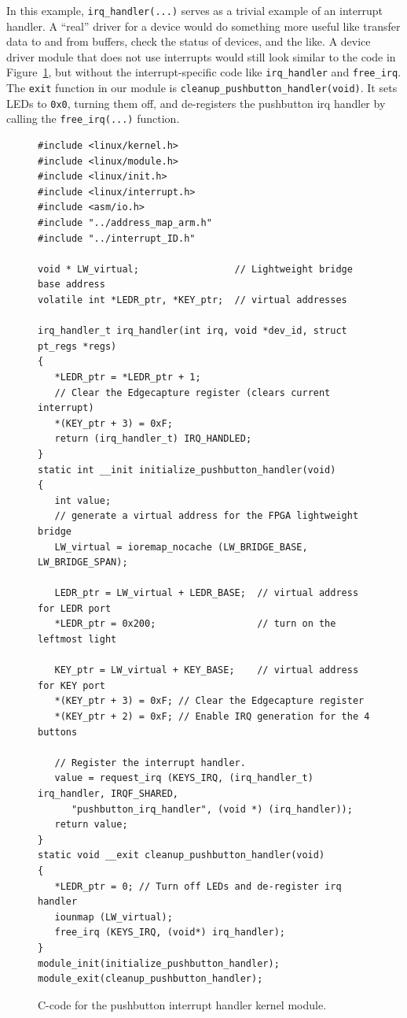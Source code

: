 \documentclass[11pt, twoside, pdftex]{article}
\begin{document}
In this example, \texttt{irq\_handler(...)} serves as a trivial example of an interrupt handler.
A ``real'' driver for a device would do something more useful like transfer data to and from 
buffers, check the status of devices, and the like. A device driver module that does not use
interrupts would still look similar to the code in Figure~\ref{fig:pushbutton_irq_handler_code}, 
but without the interrupt-specific code like \texttt{irq\_handler} and \texttt{free\_irq}.
The \texttt{exit} function in our module is \texttt{cleanup\_pushbutton\_handler(void)}. It sets 
LEDs to \texttt{0x0}, turning them off, and de-registers the pushbutton irq handler by calling 
the \texttt{free\_irq(...)} function. 

\lstset{language=C,numbers=left}
\begin{figure}[H]
\begin{center}
\begin{minipage}[t]{16 cm}
\begin{lstlisting}
#include <linux/kernel.h>
#include <linux/module.h>
#include <linux/init.h>
#include <linux/interrupt.h>
#include <asm/io.h>
#include "../address_map_arm.h"
#include "../interrupt_ID.h"

void * LW_virtual;                 // Lightweight bridge base address
volatile int *LEDR_ptr, *KEY_ptr;  // virtual addresses

irq_handler_t irq_handler(int irq, void *dev_id, struct pt_regs *regs)
{
   *LEDR_ptr = *LEDR_ptr + 1;
   // Clear the Edgecapture register (clears current interrupt)
   *(KEY_ptr + 3) = 0xF; 
   return (irq_handler_t) IRQ_HANDLED;
}
static int __init initialize_pushbutton_handler(void)
{
   int value;
   // generate a virtual address for the FPGA lightweight bridge
   LW_virtual = ioremap_nocache (LW_BRIDGE_BASE, LW_BRIDGE_SPAN);

   LEDR_ptr = LW_virtual + LEDR_BASE;  // virtual address for LEDR port
   *LEDR_ptr = 0x200;                  // turn on the leftmost light

   KEY_ptr = LW_virtual + KEY_BASE;    // virtual address for KEY port
   *(KEY_ptr + 3) = 0xF; // Clear the Edgecapture register
   *(KEY_ptr + 2) = 0xF; // Enable IRQ generation for the 4 buttons

   // Register the interrupt handler.
   value = request_irq (KEYS_IRQ, (irq_handler_t) irq_handler, IRQF_SHARED, 
      "pushbutton_irq_handler", (void *) (irq_handler));
   return value;
}
static void __exit cleanup_pushbutton_handler(void)
{
   *LEDR_ptr = 0; // Turn off LEDs and de-register irq handler
   iounmap (LW_virtual);
   free_irq (KEYS_IRQ, (void*) irq_handler);
}
module_init(initialize_pushbutton_handler);
module_exit(cleanup_pushbutton_handler);
\end{lstlisting}
\end{minipage}
\end{center}
\caption{C-code for the pushbutton interrupt handler kernel module.}
\label{fig:pushbutton_irq_handler_code}
\end{figure}
\end{document}
